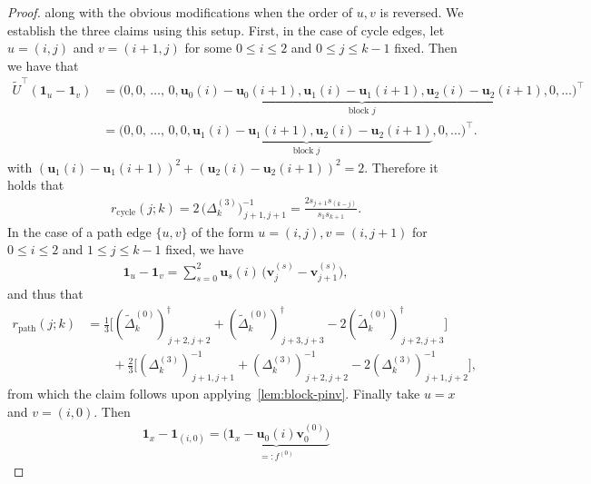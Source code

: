 \documentclass[11pt,a4paper]{amsart}
\begin{document}
\begin{proof}
    along with the obvious modifications when the order of $u, v$ is reversed. We establish the three claims using this setup. First, in the case of cycle edges, let $u=(i,j)$ and $v=(i+1,j)$ for some $0\leq i \leq 2$ and $0\leq j \leq k-1$ fixed. Then we have that
        \begin{align*}
            \widetilde{U}^\top (\mathbf{1}_u-\mathbf{1}_v) &= \bigl(0,0,\,\dots,\,0,\underbrace{\mathbf{u}_0(i) - \mathbf{u}_0(i+1) ,\mathbf{u}_1(i)- \mathbf{u}_1(i+1),\mathbf{u}_2(i) - \mathbf{u}_2(i+1)}_{\text{block }j},0,\dots\bigr)^\top\\
            &= \bigl(0,0,\,\dots,\,0,\underbrace{0 ,\mathbf{u}_1(i)- \mathbf{u}_1(i+1),\mathbf{u}_2(i) - \mathbf{u}_2(i+1)}_{\text{block }j},0,\dots\bigr)^\top.
        \end{align*}
    with $(\mathbf{u}_1(i)-\mathbf{u}_1(i+1))^2+(\mathbf{u}_2(i)-\mathbf{u}_2(i+1))^2=2$. Therefore it holds that
        \begin{align*}
            r_{\mathrm{cycle}}(j;k)
            =2\,\bigl(\Delta_k^{(3)}\bigr)^{-1}_{\,j+1,j+1} =  \frac{2s_{j+1}s_{(k-j)}}{s_1s_{k+1}}.
        \end{align*}
    In the case of a path edge $\{u, v\}$ of the form $u=(i, j), v=(i, j+1)$ for $0\leq i \leq 2$ and $1\leq j \leq k-1$ fixed, we have
        \begin{align*}
            \mathbf{1}_u-\mathbf{1}_v
            =\sum_{s=0}^2 \mathbf{u}_s(i)\,\bigl(\mathbf{v}^{(s)}_j-\mathbf{v}^{(s)}_{j+1}\bigr),
        \end{align*}
    and thus that
        \begin{align*}
            r_{\mathrm{path}}(j;k)
            &=\frac{1}{3}\bigl[
                (\widetilde\Delta_k^{(0)})^\dagger_{\,j+2,j+2}
                +(\widetilde\Delta_k^{(0)})^\dagger_{\,j+3,j+3}
                -2(\widetilde\Delta_k^{(0)})^\dagger_{\,j+2,j+3}
              \bigr]
              \\
            &\qquad+\frac{2}{3}\bigl[
                (\Delta_k^{(3)})^{-1}_{\,j+1,j+1}
                +(\Delta_k^{(3)})^{-1}_{\,j+2,j+2}
                -2(\Delta_k^{(3)})^{-1}_{\,j+1,j+2}
              \bigr],
        \end{align*}
    from which the claim follows upon applying~\cref{lem:block-pinv}. Finally take $u=x$ and $v=(i,0)$. Then
        \begin{align*}
            \mathbf{1}_x-\mathbf{1}_{(i,0)}
            =\underbrace{\bigl(\mathbf{1}_x-\mathbf{u}_0(i)\mathbf{v}^{(0)}_0\bigr)}_{=:f^{(0)}}

\end{align*}
\end{proof}
\end{document}
